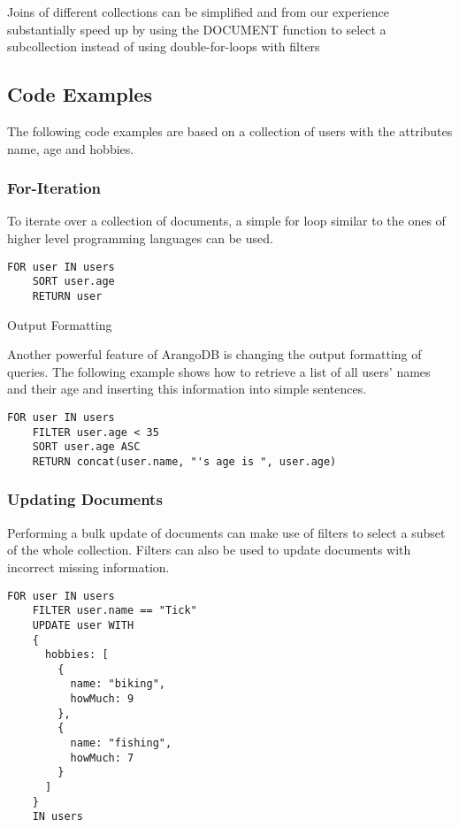 Joins of different collections can be simplified and from our experience substantially speed up by using the DOCUMENT function to select a subcollection instead of using double-for-loops with filters

\subsection{Code Examples}
The following code examples are based on a collection of users with the attributes name, age and hobbies.

\subsubsection{For-Iteration}

To iterate over a collection of documents, a simple for loop similar to the ones of higher level programming languages can be used.

\begin{lstlisting}[language=ArangoQL,label={lst:graph},caption={For-Loop}]
  FOR user IN users
    SORT user.age
    RETURN user
\end{lstlisting}

Output Formatting

Another powerful feature of ArangoDB is changing the output formatting of queries. The following example shows how to retrieve a list of all users' names and their age and inserting this information into simple sentences.

\begin{lstlisting}[language=ArangoQL,label={lst:graph},caption={Output formatting}]
  FOR user IN users
    FILTER user.age < 35
    SORT user.age ASC
    RETURN concat(user.name, "'s age is ", user.age)
\end{lstlisting}

\subsubsection{Updating Documents}

Performing a bulk update of documents can make use of filters to select a subset of the whole collection. Filters can also be used to update documents with incorrect missing information.

\begin{lstlisting}[language=ArangoQL,label={lst:graph},caption={Updating documents}]
  FOR user IN users
    FILTER user.name == "Tick"
    UPDATE user WITH
    {
      hobbies: [
        {
          name: "biking",
          howMuch: 9
        },
        {
          name: "fishing",
          howMuch: 7
        }
      ]
    }
    IN users
\end{lstlisting}

